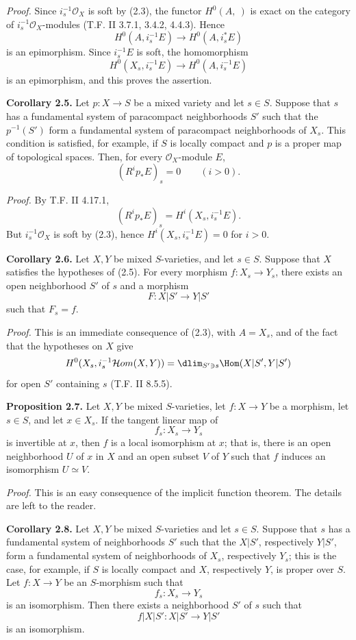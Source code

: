 \emph{Proof.} Since $i_s^{-1}\mathcal O_X$ is soft by (2.3), the functor $H^0(A,\ )$ is exact on the category of $i_s^{-1}\mathcal O_X$-modules (T.F. II 3.7.1, 3.4.2, 4.4.3). Hence
\[
 H^0(A,i_s^{-1}E)\longrightarrow H^0(A,i_s^*E)
\]
is an epimorphism. Since $i_s^{-1}E$ is soft, the homomorphism
\[
 H^0(X_s,i_s^{-1}E)\longrightarrow H^0(A,i_s^{-1}E)
\]
is an epimorphism, and this proves the assertion.

\textbf{Corollary 2.5.} Let $p:X\to S$ be a mixed variety and let $s\in S$. Suppose that $s$ has a fundamental system of paracompact neighborhoods $S'$ such that the $p^{-1}(S')$ form a fundamental system of paracompact neighborhoods of $X_s$. This condition is satisfied, for example, if $S$ is locally compact and $p$ is a proper map of topological spaces. Then, for every $\mathcal O_X$-module $E$,
\[
 (R^ip_*E)_s=0\qquad(i>0).
\]

\emph{Proof.} By T.F. II 4.17.1,
\[
 (R^ip_*E)_s=H^i(X_s,i_s^{-1}E).
\]
But $i_s^{-1}\mathcal O_X$ is soft by (2.3), hence $H^i(X_s,i_s^{-1}E)=0$ for $i>0$.

\textbf{Corollary 2.6.} Let $X,Y$ be mixed $S$-varieties, and let $s\in S$. Suppose that $X$ satisfies the hypotheses of (2.5). For every morphism $f:X_s\to Y_s$, there exists an open neighborhood $S'$ of $s$ and a morphism
\[
 F:X|S'\longrightarrow Y|S'
\]
such that $F_s=f$.

\emph{Proof.} This is an immediate consequence of (2.3), with $A=X_s$, and of the fact that the hypotheses on $X$ give
\[
 H^0(X_s,i_s^{-1}\mathcal Hom(X,Y))
 =\dlim_{S'\ni s}\Hom(X|S',Y|S')
\]
for open $S'$ containing $s$ (T.F. II 8.5.5).

\textbf{Proposition 2.7.} Let $X,Y$ be mixed $S$-varieties, let $f:X\to Y$ be a morphism, let $s\in S$, and let $x\in X_s$. If the tangent linear map of
\[
 f_s:X_s\longrightarrow Y_s
\]
is invertible at $x$, then $f$ is a local isomorphism at $x$; that is, there is an open neighborhood $U$ of $x$ in $X$ and an open subset $V$ of $Y$ such that $f$ induces an isomorphism $U\simeq V$.

\emph{Proof.} This is an easy consequence of the implicit function theorem. The details are left to the reader.

\textbf{Corollary 2.8.} Let $X,Y$ be mixed $S$-varieties and let $s\in S$. Suppose that $s$ has a fundamental system of neighborhoods $S'$ such that the $X|S'$, respectively $Y|S'$, form a fundamental system of neighborhoods of $X_s$, respectively $Y_s$; this is the case, for example, if $S$ is locally compact and $X$, respectively $Y$, is proper over $S$. Let $f:X\to Y$ be an $S$-morphism such that
\[
 f_s:X_s\longrightarrow Y_s
\]
is an isomorphism. Then there exists a neighborhood $S'$ of $s$ such that
\[
 f|X|S':X|S'\longrightarrow Y|S'
\]
is an isomorphism.

